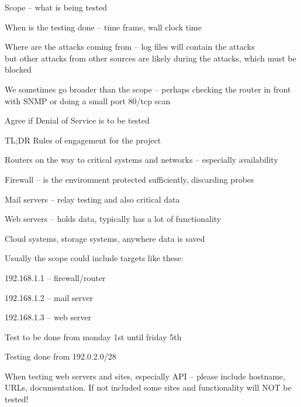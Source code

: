 \documentclass[Screen16to9,17pt]{foils}
\begin{document}
\begin{list2}
\item Scope -- what is being tested
\item When is the testing done -- time frame, wall clock time
\item Where are the attacks coming from -- log files will contain the attacks\\
but other attacks from other sources are likely during the attacks, which must be blocked
\item We sometimes go broader than the scope -- perhaps checking the router in front with SNMP or doing a small port 80/tcp scan
\item Agree if Denial of Service is to be tested
\item TL;DR Rules of engagement for the project
\end{list2}




\begin{list2}
\item Routers on the way to critical systems and networks -- especially availability
\item Firewall -- is the environment protected sufficiently, discarding probes
\item Mail servers -- relay testing and also critical data
\item Web servers -- holds data, typically has a lot of functionality
\item Cloud systems, storage systems, anywhere data is saved
\end{list2}



\begin{list1}
\item Usually the scope could include targets like these:
\begin{list2}
\item 192.168.1.1 -- firewall/router
\item 192.168.1.2 -- mail server
\item 192.168.1.3 -- web server
\item Test to be done from monday 1st until friday 5th
\item Testing done from 192.0.2.0/28
\end{list2}
\item When testing web servers and sites, especially API -- please include hostname, URLs, documentation. If not included some sites and functionality will NOT be tested!
\end{list1}
\end{document}
